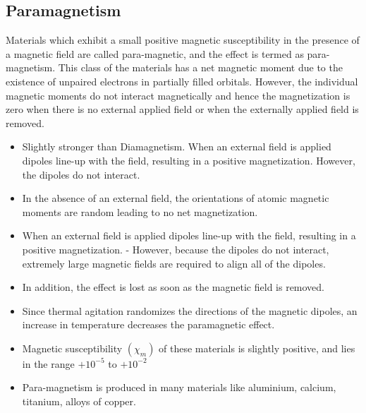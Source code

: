 \subsection{Paramagnetism} 
Materials which exhibit a small positive magnetic susceptibility in the presence of a magnetic field are called para-magnetic, and the effect is termed as para-magnetism.
This class of the materials has a net magnetic moment due to the existence of unpaired electrons in partially filled orbitals. However, the individual magnetic moments do not interact magnetically and hence the magnetization is zero when there is no external applied field or when the externally applied field is removed.
\begin{itemize}
	\item  Slightly stronger than Diamagnetism. When an external field is applied dipoles line-up with the field, resulting in a positive magnetization. However, the dipoles do not interact.
	 
	\item In the absence of an external field, the orientations of atomic magnetic moments are random leading to no net magnetization.
	\item  When an external field is applied dipoles line-up with the field, resulting in a positive magnetization.
	- However, because the dipoles do not interact, extremely large magnetic fields are required to align all of the dipoles.
	\item  In addition, the effect is lost as soon as the magnetic field is removed.
	\item  Since thermal agitation randomizes the directions of the magnetic dipoles, an increase in temperature decreases the paramagnetic effect.
	\item Magnetic susceptibility $(\chi_{m})$  of these materials is slightly positive, and lies in the range $+10^{-5}$ to $+10^{-2}$
	\item  Para-magnetism is produced in many materials like aluminium, calcium, titanium, alloys of copper.
\end{itemize}

